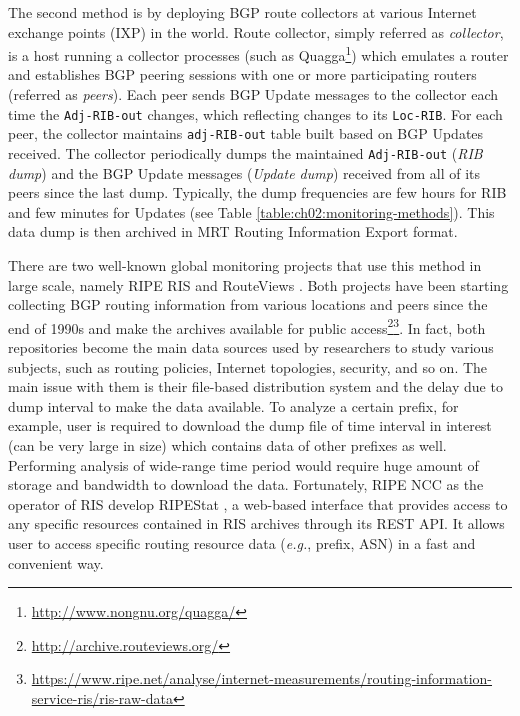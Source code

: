 The second method is by deploying BGP route collectors at various Internet exchange points (IXP) in the world. Route collector, simply referred as \textit{collector}, is a host running a collector processes (such as Quagga\footnote{\url{http://www.nongnu.org/quagga/}}) which emulates a router and establishes BGP peering sessions with one or more participating routers (referred as \textit{peers}). Each peer sends BGP Update messages to the collector each time the \texttt{Adj-RIB-out} changes, which reflecting changes to its \texttt{Loc-RIB}. For each peer, the collector maintains \texttt{adj-RIB-out} table built based on BGP Updates received. The collector periodically dumps the maintained \texttt{Adj-RIB-out} (\textit{RIB dump}) and the BGP Update messages (\textit{Update dump}) received from all of its peers since the last dump. Typically, the dump frequencies are few hours for RIB and few minutes for Updates (see Table \ref{table:ch02:monitoring-methods}). This data dump is then archived in MRT Routing Information Export \cite{rfc6396} format. 

There are two well-known global monitoring projects that use this method in large scale, namely RIPE RIS \cite{ripe-ncc-ris} and RouteViews \cite{route-views}. Both projects have been starting collecting BGP routing information from various locations and peers since the end of 1990s and make the archives available for public access\footnote{\url{http://archive.routeviews.org/}}\footnote{\url{https://www.ripe.net/analyse/internet-measurements/routing-information-service-ris/ris-raw-data}}. In fact, both repositories become the main data sources used by researchers to study various subjects, such as routing policies, Internet topologies, security, and so on. The main issue with them is their file-based distribution system and the delay due to dump interval to make the data available. To analyze a certain prefix, for example, user is required to download the dump file of time interval in interest (can be very large in size) which contains data of other prefixes as well. Performing analysis of wide-range time period would require huge amount of storage and bandwidth to download the data. Fortunately, RIPE NCC as the operator of RIS develop RIPEStat \cite{ripestat}, a web-based interface that provides access to any specific resources contained in RIS archives through its REST API. It allows user to access specific routing resource data (\textit{e.g.}, prefix, ASN) in a fast and convenient way.

